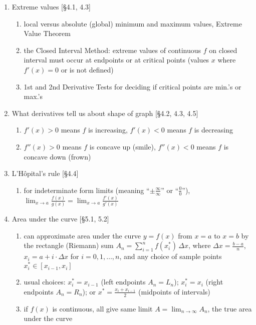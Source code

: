 \documentclass[11pt]{article}
\begin{document}
\begin{enumerate}
\item Extreme values [\S 4.1, 4.3]
\begin{enumerate}
\item local versus absolute (global) minimum and maximum values, Extreme Value Theorem
\item the Closed Interval Method: extreme values of continuous $f$ on closed interval must occur at endpoints or at critical points (values $x$ where $f'(x)=0$ or is not defined)
\item 1st and 2nd Derivative Tests for deciding if critical points are min.'s or max.'s
\end{enumerate}

\item What derivatives tell us about shape of graph [\S 4.2, 4.3, 4.5]
\begin{enumerate}
\item $f'(x)>0$ means $f$ is increasing, $f'(x) <0$ means $f$ is decreasing
\item $f''(x)>0$ means $f$ is concave up (smile), $f''(x) <0$ means $f$ is concave down (frown)
\end{enumerate}

\item L'H\^{o}pital's rule [\S 4.4]
\begin{enumerate}
\item for indeterminate form limits (meaning ``$\pm \frac{\infty}{\infty}$'' or ``$\frac{0}{0}$''), $\displaystyle \lim_{x\to a} \frac{f(x)}{g(x)} = \lim_{x\to a} \frac{f'(x)}{g'(x)}$
\end{enumerate}

\item Area under the curve [\S 5.1, 5.2]
\begin{enumerate}
\item can approximate area under the curve $y=f(x)$ from $x=a$ to $x=b$ by the rectangle (Riemann) sum $A_n = \sum_{i=1}^{n} f(x^{*}_i) \, \Delta x$, where $\Delta x = \frac{b-a}{n}$, $x_i = a + i \cdot \Delta x$ for $i=0,1,\ldots,n$, and any choice of sample points $x^*_i \in [x_{i-1},x_i]$
\item usual choices: $x^*_i = x_{i-1}$ (left endpoints $A_n =L_n$); $x^*_i=x_i$ (right endpoints $A_n=R_n$); or $x^* = \frac{x_i+x_{i-1}}{2}$ (midpoints of intervals)
\item if $f(x)$ is continuous, all give same limit $A=\lim_{n\to \infty} A_n$, the true area under the curve
\end{enumerate}


\end{enumerate}
\end{document}

